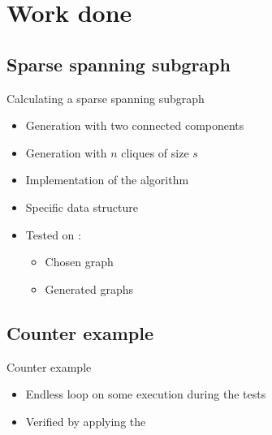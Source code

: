 \section{Work done}

\subsection{Sparse spanning subgraph}
\begin{frame}{Calculating a sparse spanning subgraph}
	\begin{itemize}
		\item Generation with two connected components
		\item Generation with $n$ cliques of size $s$
	\end{itemize}

	\begin{itemize}
		\item Implementation of the algorithm
		\item Specific data structure
		\item Tested on :
			\begin{itemize}
				\item Chosen graph
				\item Generated graphs
			\end{itemize}
	\end{itemize}
\end{frame}

\subsection{Counter example}
\begin{frame}{Counter example}
  \begin{itemize}
  \item Endless loop on some execution during the tests
  \item Verified by applying the 
  \end{itemize}
\end{frame}



